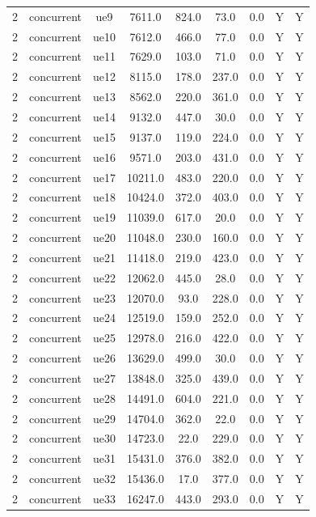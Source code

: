 \begin{table}[ht]
\begin{tabular}{|c|c|c|c|c|c|c|c|c|}
2 & concurrent & ue9 & 7611.0 & 824.0 & 73.0 & 0.0 & Y & Y \\
2 & concurrent & ue10 & 7612.0 & 466.0 & 77.0 & 0.0 & Y & Y \\
2 & concurrent & ue11 & 7629.0 & 103.0 & 71.0 & 0.0 & Y & Y \\
2 & concurrent & ue12 & 8115.0 & 178.0 & 237.0 & 0.0 & Y & Y \\
2 & concurrent & ue13 & 8562.0 & 220.0 & 361.0 & 0.0 & Y & Y \\
2 & concurrent & ue14 & 9132.0 & 447.0 & 30.0 & 0.0 & Y & Y \\
2 & concurrent & ue15 & 9137.0 & 119.0 & 224.0 & 0.0 & Y & Y \\
2 & concurrent & ue16 & 9571.0 & 203.0 & 431.0 & 0.0 & Y & Y \\
2 & concurrent & ue17 & 10211.0 & 483.0 & 220.0 & 0.0 & Y & Y \\
2 & concurrent & ue18 & 10424.0 & 372.0 & 403.0 & 0.0 & Y & Y \\
2 & concurrent & ue19 & 11039.0 & 617.0 & 20.0 & 0.0 & Y & Y \\
2 & concurrent & ue20 & 11048.0 & 230.0 & 160.0 & 0.0 & Y & Y \\
2 & concurrent & ue21 & 11418.0 & 219.0 & 423.0 & 0.0 & Y & Y \\
2 & concurrent & ue22 & 12062.0 & 445.0 & 28.0 & 0.0 & Y & Y \\
2 & concurrent & ue23 & 12070.0 & 93.0 & 228.0 & 0.0 & Y & Y \\
2 & concurrent & ue24 & 12519.0 & 159.0 & 252.0 & 0.0 & Y & Y \\
2 & concurrent & ue25 & 12978.0 & 216.0 & 422.0 & 0.0 & Y & Y \\
2 & concurrent & ue26 & 13629.0 & 499.0 & 30.0 & 0.0 & Y & Y \\
2 & concurrent & ue27 & 13848.0 & 325.0 & 439.0 & 0.0 & Y & Y \\
2 & concurrent & ue28 & 14491.0 & 604.0 & 221.0 & 0.0 & Y & Y \\
2 & concurrent & ue29 & 14704.0 & 362.0 & 22.0 & 0.0 & Y & Y \\
2 & concurrent & ue30 & 14723.0 & 22.0 & 229.0 & 0.0 & Y & Y \\
2 & concurrent & ue31 & 15431.0 & 376.0 & 382.0 & 0.0 & Y & Y \\
2 & concurrent & ue32 & 15436.0 & 17.0 & 377.0 & 0.0 & Y & Y \\
2 & concurrent & ue33 & 16247.0 & 443.0 & 293.0 & 0.0 & Y & Y \\

\end{tabular}
\end{table}

